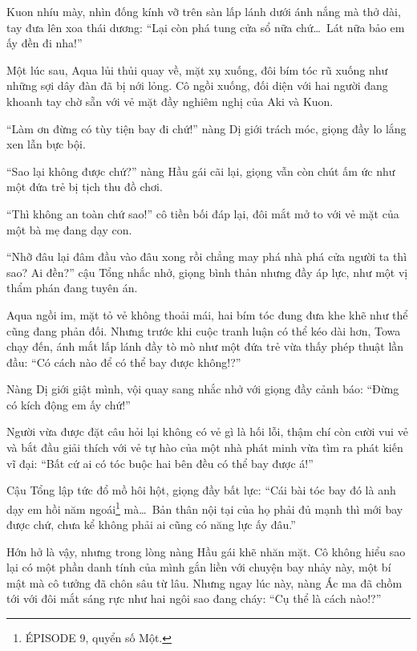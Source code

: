 \documentclass[../main.tex]{subfiles}
\begin{document}
Kuon nhíu mày, nhìn đống kính vỡ trên sàn lấp lánh dưới ánh nắng mà thở dài, tay đưa lên xoa thái dương: ``Lại còn phá tung cửa sổ nữa chứ\dots\ Lát nữa bảo em ấy đền đi nha!''

\ct

Một lúc sau, Aqua lủi thủi quay về, mặt xụ xuống, đôi bím tóc rũ xuống như những sợi dây đàn đã bị nới lỏng. Cô ngồi xuống, đối diện với hai người đang khoanh tay chờ sẵn với vẻ mặt đầy nghiêm nghị của Aki và Kuon.


``Làm ơn đừng có tùy tiện bay đi chứ!'' nàng Dị giới trách móc, giọng đầy lo lắng xen lẫn bực bội.

``Sao lại không được chứ?'' nàng Hầu gái cãi lại, giọng vẫn còn chút ấm ức như một đứa trẻ bị tịch thu đồ chơi.

``Thì không an toàn chứ sao!'' cô tiền bối đáp lại, đôi mắt mở to với vẻ mặt của một bà mẹ đang dạy con.

``Nhỡ đâu lại đâm đầu vào đâu xong rồi chẳng may phá nhà phá cửa người ta thì sao? Ai đền?'' cậu Tổng nhắc nhở, giọng bình thản nhưng đầy áp lực, như một vị thẩm phán đang tuyên án.

Aqua ngồi im, mặt tỏ vẻ không thoải mái, hai bím tóc đung đưa khe khẽ như thể cũng đang phản đối. Nhưng trước khi cuộc tranh luận có thể kéo dài hơn, Towa chạy đến, ánh mắt lấp lánh đầy tò mò như một đứa trẻ vừa thấy phép thuật lần đầu: ``Có cách nào để có thể bay được không!?''

Nàng Dị giới giật mình, vội quay sang nhắc nhở với giọng đầy cảnh báo: ``Đừng có kích động em ấy chứ!''

Người vừa được đặt câu hỏi lại không có vẻ gì là hối lỗi, thậm chí còn cười vui vẻ và bắt đầu giải thích với vẻ tự hào của một nhà phát minh vừa tìm ra phát kiến vĩ đại: ``Bất cứ ai có tóc buộc hai bên đều có thể bay được á!''

Cậu Tổng lập tức đổ mồ hôi hột, giọng đầy bất lực: ``Cái bài tóc bay đó là anh dạy em hồi năm ngoái\footnote{{\flaregothic ÉPISODE 9}, quyển số Một.} mà\dots\ Bản thân nội tại của họ phải đủ mạnh thì mới bay được chứ, chưa kể không phải ai cũng có năng lực ấy đâu.''

Hớn hở là vậy, nhưng trong lòng nàng Hầu gái khẽ nhăn mặt. Cô không hiểu sao lại có một phần danh tính của mình gắn liền với chuyện bay nhảy này, một bí mật mà cô tưởng đã chôn sâu từ lâu. Nhưng ngay lúc này, nàng Ác ma đã chồm tới với đôi mắt sáng rực như hai ngôi sao đang cháy: ``Cụ thể là cách nào!?''
\end{document}
